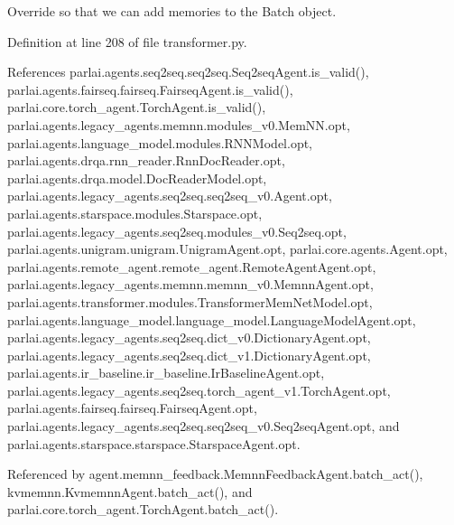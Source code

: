 \begin{DoxyVerb}Override so that we can add memories to the Batch object.\end{DoxyVerb}
 

Definition at line 208 of file transformer.\+py.



References parlai.\+agents.\+seq2seq.\+seq2seq.\+Seq2seq\+Agent.\+is\+\_\+valid(), parlai.\+agents.\+fairseq.\+fairseq.\+Fairseq\+Agent.\+is\+\_\+valid(), parlai.\+core.\+torch\+\_\+agent.\+Torch\+Agent.\+is\+\_\+valid(), parlai.\+agents.\+legacy\+\_\+agents.\+memnn.\+modules\+\_\+v0.\+Mem\+N\+N.\+opt, parlai.\+agents.\+language\+\_\+model.\+modules.\+R\+N\+N\+Model.\+opt, parlai.\+agents.\+drqa.\+rnn\+\_\+reader.\+Rnn\+Doc\+Reader.\+opt, parlai.\+agents.\+drqa.\+model.\+Doc\+Reader\+Model.\+opt, parlai.\+agents.\+legacy\+\_\+agents.\+seq2seq.\+seq2seq\+\_\+v0.\+Agent.\+opt, parlai.\+agents.\+starspace.\+modules.\+Starspace.\+opt, parlai.\+agents.\+legacy\+\_\+agents.\+seq2seq.\+modules\+\_\+v0.\+Seq2seq.\+opt, parlai.\+agents.\+unigram.\+unigram.\+Unigram\+Agent.\+opt, parlai.\+core.\+agents.\+Agent.\+opt, parlai.\+agents.\+remote\+\_\+agent.\+remote\+\_\+agent.\+Remote\+Agent\+Agent.\+opt, parlai.\+agents.\+legacy\+\_\+agents.\+memnn.\+memnn\+\_\+v0.\+Memnn\+Agent.\+opt, parlai.\+agents.\+transformer.\+modules.\+Transformer\+Mem\+Net\+Model.\+opt, parlai.\+agents.\+language\+\_\+model.\+language\+\_\+model.\+Language\+Model\+Agent.\+opt, parlai.\+agents.\+legacy\+\_\+agents.\+seq2seq.\+dict\+\_\+v0.\+Dictionary\+Agent.\+opt, parlai.\+agents.\+legacy\+\_\+agents.\+seq2seq.\+dict\+\_\+v1.\+Dictionary\+Agent.\+opt, parlai.\+agents.\+ir\+\_\+baseline.\+ir\+\_\+baseline.\+Ir\+Baseline\+Agent.\+opt, parlai.\+agents.\+legacy\+\_\+agents.\+seq2seq.\+torch\+\_\+agent\+\_\+v1.\+Torch\+Agent.\+opt, parlai.\+agents.\+fairseq.\+fairseq.\+Fairseq\+Agent.\+opt, parlai.\+agents.\+legacy\+\_\+agents.\+seq2seq.\+seq2seq\+\_\+v0.\+Seq2seq\+Agent.\+opt, and parlai.\+agents.\+starspace.\+starspace.\+Starspace\+Agent.\+opt.



Referenced by agent.\+memnn\+\_\+feedback.\+Memnn\+Feedback\+Agent.\+batch\+\_\+act(), kvmemnn.\+Kvmemnn\+Agent.\+batch\+\_\+act(), and parlai.\+core.\+torch\+\_\+agent.\+Torch\+Agent.\+batch\+\_\+act().

